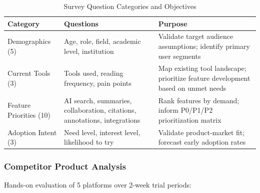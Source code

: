 \begin{table}[H]
    \centering
    \small
    \begin{tabular}{|>{\raggedright\arraybackslash}p{3.2cm}|>{\raggedright\arraybackslash}p{4.2cm}|>{\raggedright\arraybackslash}p{7.4cm}|}
        \hline
        \textbf{Category}                                                         & \textbf{Questions} & \textbf{Purpose} \\
        \hline
        Demographics (5)                                                          &
        Age, role, field, academic level, institution                             &
        Validate target audience assumptions; identify primary user segments                                              \\
        \hline
        Current Tools (3)                                                         &
        Tools used, reading frequency, pain points                                &
        Map existing tool landscape; prioritize feature development based on unmet needs                                  \\
        \hline
        Feature Priorities (10)                                                   &
        AI search, summaries, collaboration, citations, annotations, integrations &
        Rank features by demand; inform P0/P1/P2 prioritization matrix                                                    \\
        \hline
        Adoption Intent (3)                                                       &
        Need level, interest level, likelihood to try                             &
        Validate product-market fit; forecast early adoption rates                                                        \\
        \hline
    \end{tabular}
    \caption{Survey Question Categories and Objectives}
    \label{table:survey-categories}
\end{table}

\subsubsection{Competitor Product Analysis}

Hands-on evaluation of 5 platforms over 2-week trial periods:

